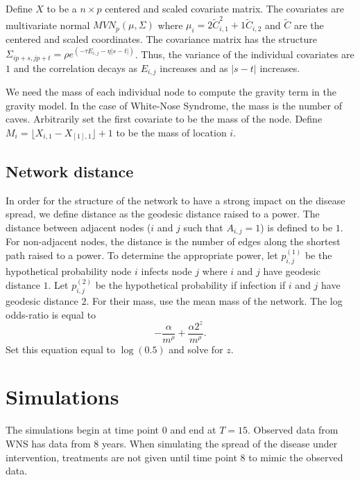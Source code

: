 \documentclass[11pt]{article}
\begin{document}
Define $X$ to be a $n \times p$ centered and scaled covariate matrix.
The covariates are multivariate normal $MVN_p(\mu,\Sigma)$ where
$\mu_i = 2\widetilde{C}_{i,1}^2 + 1\widetilde{C}_{i,2}$ and
$\widetilde{C}$ are the centered and scaled coordinates.  The
covariance matrix has the structure $\Sigma_{ip + s, jp + t} =
   \rho e^{(-\tau  E_{i,j} - \eta |s-t|)}$.  Thus, the variance of the
individual covariates are $1$ and the correlation decays as $E_{i,j}$
increases and as $|s-t|$ increases.

We need the mass of each individual node to compute the gravity term
in the gravity model.  In the case of White-Nose Syndrome, the mass is
the number of caves.  Arbitrarily set the first covariate to be the
mass of the node.  Define $M_i = \lfloor X_{i,1} - X_{[1],1} \rfloor +
   1$ to be the mass of location $i$.


\subsection{Network distance}
\label{sec-3-3}

In order for the structure of the network to have a strong impact on
the disease spread, we define distance as the geodesic distance raised
to a power.  The distance between adjacent nodes ($i$ and $j$ such
that $A_{i,j} = 1$) is defined to be $1$.  For non-adjacent nodes, the
distance is the number of edges along the shortest path raised to a
power.  To determine the appropriate power, let $p^{(1)}_{i,j}$ be the
hypothetical probability node $i$ infects node $j$ where $i$ and $j$
have geodesic distance $1$.  Let $p^{(2)}_{i,j}$ be the hypothetical
probability if infection if $i$ and $j$ have geodesic distance $2$.
For their mass, use the mean mass of the network.  The log odds-ratio
is equal to
\begin{equation*}
- \frac{\alpha}{m^\rho} + \frac{\alpha2^z}{m^\rho}.
\end{equation*}
Set this equation equal to $\log(0.5)$ and solve for $z$.


\section{Simulations}
\label{sec-4}

The simulations begin at time point $0$ and end at $T=15$.  Observed
data from WNS has data from $8$ years.  When simulating the spread
of the disease under intervention, treatments are not given until
time point $8$ to mimic the observed data.
\end{document}
